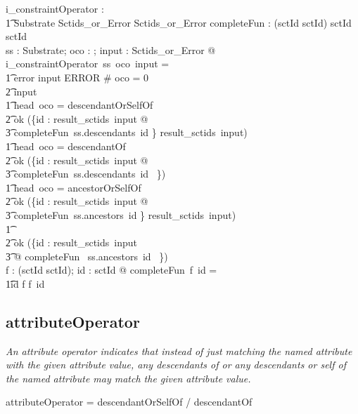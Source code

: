\documentclass{article}
\def\bnf#1{{\scriptsize {{#1}} }}
\def\desc#1{{\small \textsl{{#1}} }}
\begin{document}
\begin{axdef}
   i\_constraintOperator : \\
\t1 Substrate \fun \optional[constraintOperator] \fun Sctids\_or\_Error \fun Sctids\_or\_Error
\also
   completeFun : (sctId \pfun \power sctId) \fun sctId \fun \power sctId \\
\where
	\forall ss : Substrate; oco : \optional[constraintOperator]; input : Sctids\_or\_Error @ \\
i\_constraintOperator~ss~oco~input = \\
\t1 \IF error \inv input \in ERROR \lor \# oco = 0  \THEN  \\
\t2 input \\
\t1 \ELSE \IF head~oco = descendantOrSelfOf \THEN \\
\t2 ok (\bigcup \{id : result\_sctids~input @ \\
\t3 completeFun~ss.descendants~id \} \cup result\_sctids~input) \\
\t1 \ELSE \IF head~oco = descendantOf~ \THEN \\
\t2 ok  (\bigcup \{id : result\_sctids~input @ \\
\t3 completeFun~ss.descendants~id ~\}) \\
\t1 \ELSE \IF head~oco = ancestorOrSelfOf~ \THEN  \\
\t2 ok (\bigcup \{id : result\_sctids~input @ \\
\t3 completeFun~ss.ancestors~id \} \cup result\_sctids~input) \\
\t1 \ELSE  \\
\t2 ok (\bigcup \{id : result\_sctids~input \\
\t3 @ completeFun~ ss.ancestors~id ~\}) \\
\also
   \forall f : (sctId \pfun \power sctId); id : sctId @ completeFun~f~id = \\
\t1\IF id \in \dom f \THEN f~id \ELSE \emptyset 
\end{axdef}

\subsection{attributeOperator}
\begin{framed}
\desc{An attribute operator indicates that instead of just matching the named attribute with the given attribute value, any descendants of or any descendants or self of the named attribute may match the given attribute value.}
\end{framed}
\begin{framed}
\bnf{attributeOperator = descendantOrSelfOf / descendantOf}
\end{framed}
\end{document}
